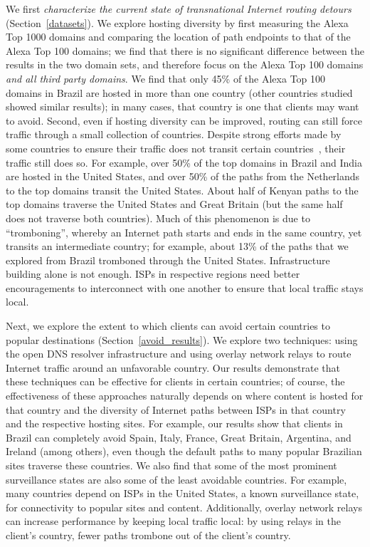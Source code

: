 We first {\em characterize the current state of transnational Internet
routing detours} (Section~\ref{datasets}).  We explore hosting diversity 
by first measuring the Alexa Top 1000 domains and comparing the location of 
path endpoints to that of the Alexa Top 100 domains; we find that there is no 
significant difference between the results in the two domain sets, and therefore 
focus on the Alexa Top 100 domains {\it and all third party domains}.  We find 
that only 45\% of the Alexa Top 100 domains in Brazil are hosted 
in more than one country (other countries studied showed similar results); in many cases,
that country is one that clients may want to avoid. Second, even if
hosting diversity can be improved, routing can still force traffic
through a small collection of countries. Despite strong efforts made by some countries to ensure their
traffic does not transit certain countries~\cite{brazil_history,
  brazil_break_from_US, brazil_conference, brazil_conference2,
  brazil_human_rights}, their traffic still does so.  For example, over 50\% of the
top domains in Brazil and India are hosted in the United States, and
over 50\% of the paths from the Netherlands to the top domains transit
the United States.  About half of Kenyan paths to the top domains
traverse the United States and Great Britain (but the same half does not
traverse both countries).  Much of this phenomenon is due to
``tromboning'', whereby an Internet path starts and ends in the same country,
yet transits an intermediate country; for example, about 13\% of the
paths that we explored from Brazil tromboned through the United States.
Infrastructure building alone is not enough. ISPs in respective regions
need better encouragements to interconnect with one another to ensure
that local traffic stays local.

Next, we {explore the extent to which
clients can avoid certain countries to popular destinations}
(Section~\ref{avoid_results}).  We explore two techniques: using the
open DNS resolver infrastructure and using overlay network relays to route 
Internet traffic around an unfavorable country.  Our results demonstrate that these techniques can
be effective for clients in certain countries; of course, the effectiveness of
these approaches naturally depends on where content is hosted for that country
and the diversity of Internet paths between ISPs in that country and the
respective hosting sites. For example, our results show that clients in Brazil
can completely avoid Spain, Italy, France, Great Britain, Argentina, and
Ireland (among others), even though the default paths to many popular
Brazilian sites traverse these countries. We also find that some of the most
prominent surveillance states are also some of the least avoidable countries.
For example, many countries depend on ISPs in the United States, a known
surveillance state, for connectivity to popular sites and content.
Additionally, overlay network relays can increase performance by keeping local
traffic local: by using relays in the client's country, fewer paths trombone
out of the client's country.

